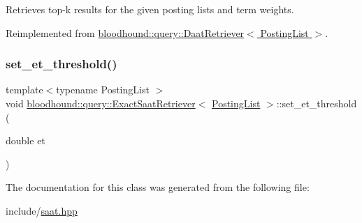 Retrieves top-\/k results for the given posting lists and term weights. 



Reimplemented from \hyperlink{classbloodhound_1_1query_1_1DaatRetriever_ab80b4867fc263827dc2fdbe0965a2e8c}{bloodhound\+::query\+::\+Daat\+Retriever$<$ Posting\+List $>$}.

\mbox{\label{classbloodhound_1_1query_1_1ExactSaatRetriever_a78016cfffe921ed440dec62c6f82f4cc}} 
\subsubsection{\texorpdfstring{set\+\_\+et\+\_\+threshold()}{set\_et\_threshold()}}
{\footnotesize\ttfamily template$<$typename Posting\+List $>$ \\
void \hyperlink{classbloodhound_1_1query_1_1ExactSaatRetriever}{bloodhound\+::query\+::\+Exact\+Saat\+Retriever}$<$ \hyperlink{classbloodhound_1_1PostingList}{Posting\+List} $>$\+::set\+\_\+et\+\_\+threshold (\begin{DoxyParamCaption}\item[{double}]{et }\end{DoxyParamCaption})\hspace{0.3cm}{\ttfamily [inline]}}



The documentation for this class was generated from the following file\+:\begin{DoxyCompactItemize}
\item 
include/\hyperlink{saat_8hpp}{saat.\+hpp}\end{DoxyCompactItemize}
